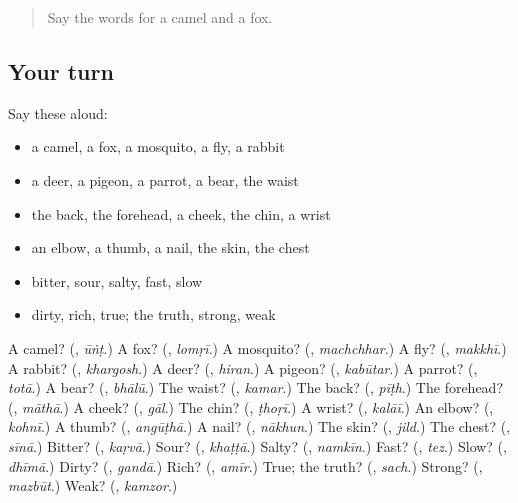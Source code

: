 \label{lesson:UR-R132-second-pass-the-body-and-describing-words}



\begin{quote}
Say the words for a camel and a fox.
\end{quote}

\subsection*{Your turn}
Say these aloud:

\begin{itemize}
\raggedright
  \item a camel, a fox, a mosquito, a fly, a rabbit
  \item a deer, a pigeon, a parrot, a bear, the waist
  \item the back, the forehead, a cheek, the chin, a wrist
  \item an elbow, a thumb, a nail, the skin, the chest
  \item bitter, sour, salty, fast, slow
  \item dirty, rich, true; the truth, strong, weak
\end{itemize}

\begin{tcolorbox}[breakable,colback=teal!4,colframe=teal!35!black,title={Before you move on}]
A camel? (\textbf{}, \emph{ūṅṭ}.) A fox? (\textbf{}, \emph{lomṛī}.) A mosquito? (\textbf{}, \emph{machchhar}.) A fly? (\textbf{}, \emph{makkhī}.) A rabbit? (\textbf{}, \emph{khargosh}.) A deer? (\textbf{}, \emph{hiran}.) A pigeon? (\textbf{}, \emph{kabūtar}.) A parrot? (\textbf{}, \emph{totā}.) A bear? (\textbf{}, \emph{bhālū}.) The waist? (\textbf{}, \emph{kamar}.) The back? (\textbf{}, \emph{pīṭh}.) The forehead? (\textbf{}, \emph{māthā}.) A cheek? (\textbf{}, \emph{gāl}.) The chin? (\textbf{}, \emph{ṭhoṛī}.) A wrist? (\textbf{}, \emph{kalāī}.) An elbow? (\textbf{}, \emph{kohnī}.) A thumb? (\textbf{}, \emph{angūṭhā}.) A nail? (\textbf{}, \emph{nākhun}.) The skin? (\textbf{}, \emph{jild}.) The chest? (\textbf{}, \emph{sīnā}.) Bitter? (\textbf{}, \emph{kaṛvā}.) Sour? (\textbf{}, \emph{khaṭṭā}.) Salty? (\textbf{}, \emph{namkīn}.) Fast? (\textbf{}, \emph{tez}.) Slow? (\textbf{}, \emph{dhīmā}.) Dirty? (\textbf{}, \emph{gandā}.) Rich? (\textbf{}, \emph{amīr}.) True; the truth? (\textbf{}, \emph{sach}.) Strong? (\textbf{}, \emph{mazbūt}.) Weak? (\textbf{}, \emph{kamzor}.)
\end{tcolorbox}
